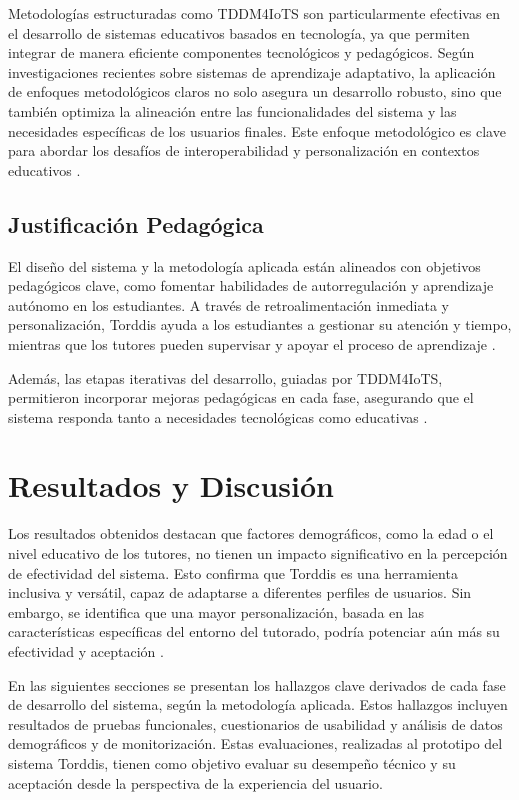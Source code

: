 \documentclass[a4paper,fleqn]{cas-sc}
\begin{document}
			Metodologías estructuradas como TDDM4IoTS son particularmente efectivas en el desarrollo de sistemas educativos basados en tecnología, ya que permiten integrar de manera eficiente componentes tecnológicos y pedagógicos. Según investigaciones recientes sobre sistemas de aprendizaje adaptativo, la aplicación de enfoques metodológicos claros no solo asegura un desarrollo robusto, sino que también optimiza la alineación entre las funcionalidades del sistema y las necesidades específicas de los usuarios finales. Este enfoque metodológico es clave para abordar los desafíos de interoperabilidad y personalización en contextos educativos \citep{Wang2025Development}.
			
		\subsection{Justificación Pedagógica}
			El diseño del sistema y la metodología aplicada están alineados con objetivos pedagógicos clave, como fomentar habilidades de autorregulación y aprendizaje autónomo en los estudiantes. A través de retroalimentación inmediata y personalización, Torddis ayuda a los estudiantes a gestionar su atención y tiempo, mientras que los tutores pueden supervisar y apoyar el proceso de aprendizaje \citep{Chen2025Unpacking}.
			
			Además, las etapas iterativas del desarrollo, guiadas por TDDM4IoTS, permitieron incorporar mejoras pedagógicas en cada fase, asegurando que el sistema responda tanto a necesidades tecnológicas como educativas \citep{Huang2025How}.
			
	\section{Resultados y Discusión}
	\label{seccion:Cinco}
		Los resultados obtenidos destacan que factores demográficos, como la edad o el nivel educativo de los tutores, no tienen un impacto significativo en la percepción de efectividad del sistema. Esto confirma que Torddis es una herramienta inclusiva y versátil, capaz de adaptarse a diferentes perfiles de usuarios. Sin embargo, se identifica que una mayor personalización, basada en las características específicas del entorno del tutorado, podría potenciar aún más su efectividad y aceptación \citep{Leiss2024Students}.
		
		En las siguientes secciones se presentan los hallazgos clave derivados de cada fase de desarrollo del sistema, según la metodología aplicada. Estos hallazgos incluyen resultados de pruebas funcionales, cuestionarios de usabilidad y análisis de datos demográficos y de monitorización. Estas evaluaciones, realizadas al prototipo del sistema Torddis, tienen como objetivo evaluar su desempeño técnico y su aceptación desde la perspectiva de la experiencia del usuario.
		
\end{document}
